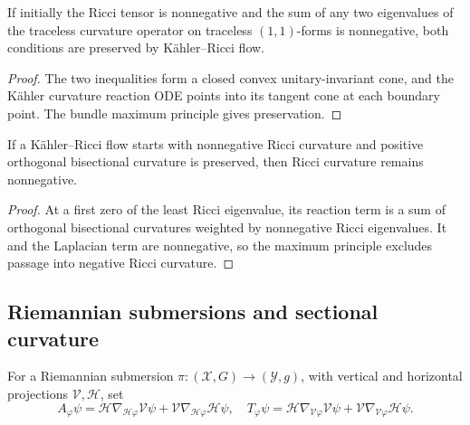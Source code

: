 \begin{example}
\label{ex:chow-ii-traceless-kahler-curvature-preserved}

If initially the Ricci tensor is nonnegative and the sum of any two
eigenvalues of the traceless curvature operator on traceless \((1,1)\)-forms
is nonnegative, both conditions are preserved by Kähler--Ricci flow.
\end{example}
\begin{proof}
\sketch
{}
The two inequalities form a closed convex unitary-invariant cone, and the
Kähler curvature reaction ODE points into its tangent cone at each boundary
point.  The bundle maximum principle gives preservation.
\end{proof}

\begin{example}
\label{ex:chow-ii-orthogonal-bisectional-preserves-ricci}

If a Kähler--Ricci flow starts with nonnegative Ricci curvature and positive
orthogonal bisectional curvature is preserved, then Ricci curvature remains
nonnegative.
\end{example}
\begin{proof}
\sketch
At a first zero of the least Ricci eigenvalue, its reaction term is a sum of
orthogonal bisectional curvatures weighted by nonnegative Ricci eigenvalues.
It and the Laplacian term are nonnegative, so the maximum principle excludes
passage into negative Ricci curvature.
\end{proof}

\subsection{Riemannian submersions and sectional curvature}

For a Riemannian submersion \(\pi:(\mathcal X,G)\to(\mathcal Y,g)\), with
vertical and horizontal projections \(\mathcal V,\mathcal H\), set
\[
 A_\varphi\psi=\mathcal H\nabla_{\mathcal H\varphi}\mathcal V\psi
 +\mathcal V\nabla_{\mathcal H\varphi}\mathcal H\psi,
 \quad
 T_\varphi\psi=\mathcal H\nabla_{\mathcal V\varphi}\mathcal V\psi
 +\mathcal V\nabla_{\mathcal V\varphi}\mathcal H\psi.
\]

